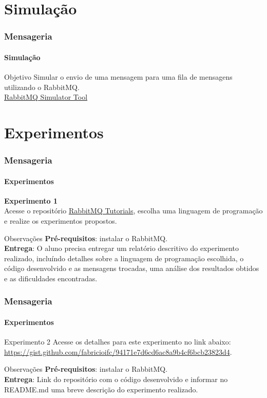 \documentclass[
	9pt, %
	t, %
]{beamer}
\newcommand{\iconLink}[2]{\href{#1}{\faLink \hspace{0.2em} {#2}}}
\begin{document}

\section{Simulação}

\begin{frame}
	\frametitle{Mensageria}
	\framesubtitle{Simulação}
	\centering

	\begin{block}{Objetivo}
		Simular o envio de uma mensagem para uma fila de mensagens utilizando o RabbitMQ.
		\\ \bigskip
		\iconLink{https://tryrabbitmq.com/}{RabbitMQ Simulator Tool}
	\end{block}

\end{frame}

\section{Experimentos}

\begin{frame}
	\frametitle{Mensageria}
	\framesubtitle{Experimentos}

	{\Large \textbf{Experimento 1}} \\

	Acesse o repositório
	\iconLink{https://github.com/rabbitmq/rabbitmq-tutorials?tab=readme-ov-file}{RabbitMQ
		Tutorials}, escolha uma linguagem de programação e realize os experimentos
	propostos.

	\begin{block}{Observações}
		\textbf{Pré-requisitos}: instalar o RabbitMQ.\\
		\textbf{Entrega}: O aluno precisa entregar um relatório descritivo do experimento realizado, incluíndo detalhes sobre a linguagem de programação escolhida, o código desenvolvido e as mensagens trocadas, uma análise dos resultados obtidos e as dificuldades encontradas.
	\end{block}

\end{frame}

\begin{frame}
	\frametitle{Mensageria}
	\framesubtitle{Experimentos}

	\begin{block}{Experimento 2}
		Acesse os detalhes para este experimento no link abaixo:\\
		\iconLink{https://gist.github.com/fabricioifc/94171e7d6cd6ac8a9b4cf6bcb23823d4}{https://gist.github.com/fabricioifc/94171e7d6cd6ac8a9b4cf6bcb23823d4}.
	\end{block}

	\begin{block}{Observações}
		\textbf{Pré-requisitos}: instalar o RabbitMQ.\\
		\textbf{Entrega}: Link do repositório com o código desenvolvido e informar no README.md uma breve descrição do experimento realizado.
	\end{block}

\end{frame}
\end{document}
